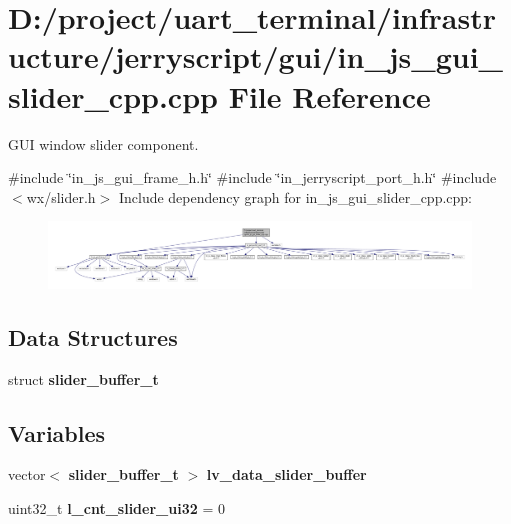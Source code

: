 \section{D\+:/project/uart\+\_\+terminal/infrastructure/jerryscript/gui/in\+\_\+js\+\_\+gui\+\_\+slider\+\_\+cpp.cpp File Reference}
\label{in__js__gui__slider__cpp_8cpp}


G\+UI window slider component.  


{\ttfamily \#include \char`\"{}in\+\_\+js\+\_\+gui\+\_\+frame\+\_\+h.\+h\char`\"{}}\newline
{\ttfamily \#include \char`\"{}in\+\_\+jerryscript\+\_\+port\+\_\+h.\+h\char`\"{}}\newline
{\ttfamily \#include $<$wx/slider.\+h$>$}\newline
Include dependency graph for in\+\_\+js\+\_\+gui\+\_\+slider\+\_\+cpp.\+cpp\+:\nopagebreak
\begin{figure}[H]
\begin{center}
\leavevmode
\includegraphics[width=350pt]{in__js__gui__slider__cpp_8cpp__incl}
\end{center}
\end{figure}
\subsection*{Data Structures}
\begin{DoxyCompactItemize}
\item 
struct \textbf{ slider\+\_\+buffer\+\_\+t}
\end{DoxyCompactItemize}
\subsection*{Variables}
\begin{DoxyCompactItemize}
\item 
vector$<$ \textbf{ slider\+\_\+buffer\+\_\+t} $>$ \textbf{ lv\+\_\+data\+\_\+slider\+\_\+buffer}
\item 
uint32\+\_\+t {\bfseries l\+\_\+cnt\+\_\+slider\+\_\+ui32} = 0
\end{DoxyCompactItemize}



